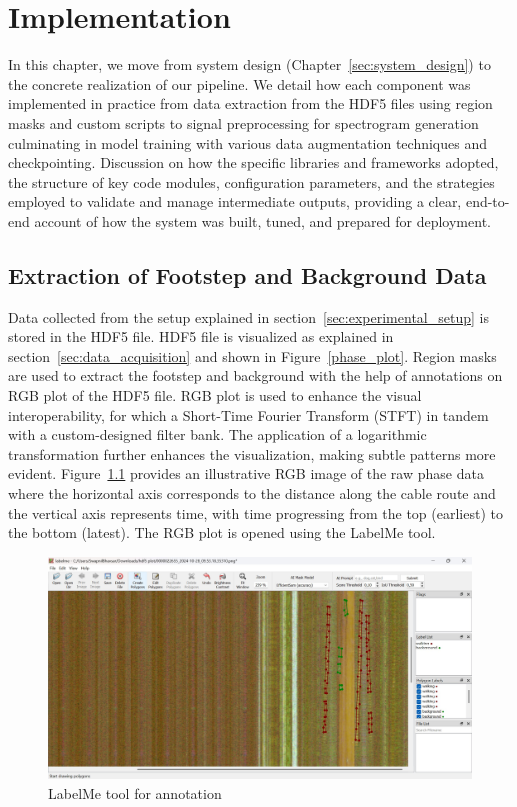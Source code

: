 

\chapter{Implementation}
\label{ch:implementation}

In this chapter, we move from system design (Chapter~\ref{sec:system_design}) to the concrete realization of our pipeline.  We detail how each component was implemented in practice from data extraction from the HDF5 files using region masks and custom scripts to signal preprocessing for spectrogram generation culminating in model training with various data augmentation techniques and checkpointing. Discussion on how the specific libraries and frameworks adopted, the structure of key code modules, configuration parameters, and the strategies employed to validate and manage intermediate outputs, providing a clear, end-to-end account of how the system was built, tuned, and prepared for deployment.  


\section{Extraction of Footstep and Background Data}
Data collected from the setup explained in section~\ref{sec:experimental_setup} is stored in the HDF5 file. HDF5 file is visualized as explained in section~\ref{sec:data_acquisition} and shown in Figure~\ref{phase_plot}. Region masks are used to extract the footstep and background with the help of annotations on RGB plot of the HDF5 file. RGB plot is used to enhance the visual interoperability, for which a Short-Time Fourier Transform (STFT) in tandem with a custom-designed filter bank. The application of a logarithmic transformation further enhances the visualization, making subtle patterns more evident. Figure~\ref{labelme} provides an illustrative RGB image of the raw phase data where the horizontal axis corresponds to the distance along the cable route and the vertical axis represents time, with time progressing from the top (earliest) to the bottom (latest). The RGB plot is opened using the LabelMe tool. 

\begin{figure}[h]
    \centering
    \includegraphics[width=\linewidth]{Bilder/jpg/label.jpg}
    \caption{LabelMe tool for annotation}
    \label{labelme}
\end{figure}

